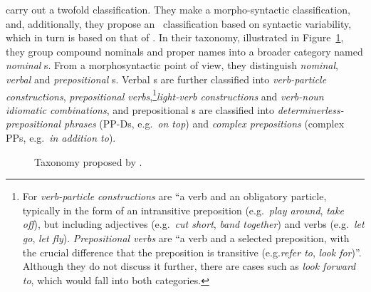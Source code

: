 \documentclass[output=paper]{langsci/langscibook}
\begin{document}
\citet{Baldwin2010} carry out a twofold classification. 
They make a morpho-syntactic classification, and, additionally, they propose an \mwe\ classification based on syntactic variability, which in turn is based on that of \citet{Sag:2002}.
In their taxonomy, illustrated in Figure~\ref{fig:Baldwin_taxonomy}, they group compound nominals and proper names into a broader category named \textit{nominal} \mwe s. 
From a morphosyntactic point of view, they distinguish \textit{nominal}, \textit{verbal} and \textit{prepositional} \mwe s. 
Verbal \mwe s are further classified into \textit{verb-particle constructions}, \textit{prepositional verbs},\footnote{For \citet{Baldwin2010} \textit{verb-particle constructions} are ``a verb and an obligatory particle, typically in the form of an intransitive preposition (e.g.\ \textit{play around}, \textit{take off}), but including adjectives (e.g.\ \textit{cut short}, \textit{band together}) and verbs (e.g.\ \textit{let go}, \textit{let fly}).
\textit{Prepositional verbs} are ``a verb and a selected preposition, with the crucial difference that the preposition is transitive (e.g.\@ \textit{refer to}, \textit{look for})''. Although they do not discuss it further, there are cases such as \textit{look forward to}, which would fall into both categories.}\textit{light-verb constructions} and \textit{verb-noun idiomatic combinations}, and prepositional \mwe s are classified into \textit{determinerless-prepositional phrases} (\small{PP-D}s, e.g.\ \textit{on top}) and \textit{complex prepositions} (complex \small{PP}s, e.g.\ \textit{in addition to}).

\begin{figure}[h]
\centering
{}
\caption{Taxonomy proposed by \citet{Baldwin2010}.}
\label{fig:Baldwin_taxonomy}
\end{figure}
\end{document}
